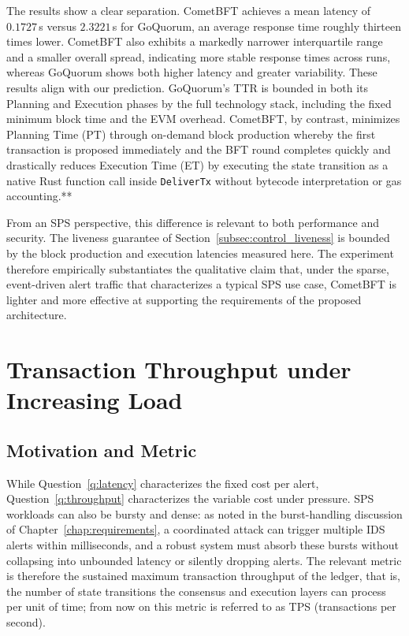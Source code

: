 The results show a clear separation. CometBFT achieves a mean latency of $0.1727$\,s versus $2.3221$\,s for GoQuorum, an average response time roughly thirteen times lower. CometBFT also exhibits a markedly narrower interquartile range and a smaller overall spread, indicating more stable response times across runs, whereas GoQuorum shows both higher latency and greater variability. These results align with our prediction. GoQuorum's TTR is bounded in both its Planning and Execution phases by the full technology stack, including the fixed minimum block time and the EVM overhead. CometBFT, by contrast, minimizes Planning Time (PT) through on-demand block production whereby the first transaction is proposed immediately and the BFT round completes quickly and drastically reduces Execution Time (ET) by executing the state transition as a native Rust function call inside \texttt{DeliverTx} without bytecode interpretation or gas accounting.**

From an SPS perspective, this difference is relevant to both performance and security. The liveness guarantee of Section~\ref{subsec:control_liveness} is bounded by the block production and execution latencies measured here. The experiment therefore empirically substantiates the qualitative claim that, under the sparse, event-driven alert traffic that characterizes a typical SPS use case, CometBFT is lighter and more effective at supporting the requirements of the proposed architecture.
\section{Transaction Throughput under Increasing Load}
\label{sec:exp_throughput}

\subsection{Motivation and Metric}

While Question~\ref{q:latency} characterizes the fixed cost per alert, Question~\ref{q:throughput} characterizes the variable cost under pressure. SPS workloads can also be bursty and dense: as noted in the burst-handling discussion of Chapter~\ref{chap:requirements}, a coordinated attack can trigger multiple IDS alerts within milliseconds, and a robust system must absorb these bursts without collapsing into unbounded latency or silently dropping alerts. The relevant metric is therefore the sustained maximum transaction throughput of the ledger, that is, the number of state transitions the consensus and execution layers can process per unit of time; from now on this metric is referred to as TPS (transactions per second).

